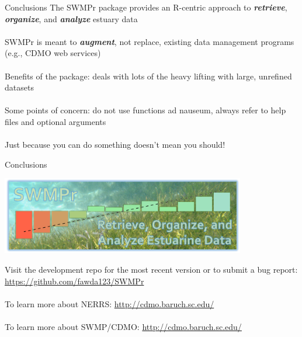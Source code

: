 \documentclass[serif]{beamer}\usepackage[]{graphicx}\usepackage[]{color}
\newcommand{\Bigtxt}[1]{\textbf{\textit{#1}}}
\begin{document}
\begin{frame}{Conclusions}
The SWMPr package provides an R-centric approach to \Bigtxt{retrieve}, \Bigtxt{organize}, and \Bigtxt{analyze} estuary data \\~\\
SWMPr is meant to \Bigtxt{augment}, not replace, existing data management programs (e.g., CDMO web services) \\~\\
Benefits of the package: deals with lots of the heavy lifting with large, unrefined datasets \\~\\
Some points of concern: do not use functions ad nauseum, always refer to help files and optional arguments\\~\\
Just because you can do something doesn't mean you should!
\end{frame}

\begin{frame}{Conclusions}
\centerline{\includegraphics[width = 0.8\textwidth]{fig/swmpr_logo.png}}
\vspace{0.15in}
Visit the development repo for the most recent version or to submit a bug report: \href{https://github.com/fawda123/SWMPr}{https://github.com/fawda123/SWMPr}\\~\\
To learn more about NERRS: \href{http://www.nerrs.noaa.gov/}{http://cdmo.baruch.sc.edu/} \\~\\
To learn more about SWMP/CDMO: \href{http://cdmo.baruch.sc.edu/}{http://cdmo.baruch.sc.edu/}
\end{frame}
\end{document}
